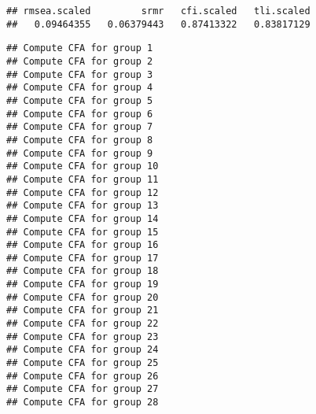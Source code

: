 \documentclass[
]{article}
\newenvironment{Shaded}{\begin{snugshade}}{\end{snugshade}}
\newcommand{\AttributeTok}[1]{\textcolor[rgb]{0.77,0.63,0.00}{#1}}
\newcommand{\CommentTok}[1]{\textcolor[rgb]{0.56,0.35,0.01}{\textit{#1}}}
\newcommand{\FloatTok}[1]{\textcolor[rgb]{0.00,0.00,0.81}{#1}}
\newcommand{\FunctionTok}[1]{\textcolor[rgb]{0.00,0.00,0.00}{#1}}
\newcommand{\NormalTok}[1]{#1}
\newcommand{\OtherTok}[1]{\textcolor[rgb]{0.56,0.35,0.01}{#1}}
\newcommand{\SpecialCharTok}[1]{\textcolor[rgb]{0.00,0.00,0.00}{#1}}
\newcommand{\StringTok}[1]{\textcolor[rgb]{0.31,0.60,0.02}{#1}}
\begin{document}
\begin{verbatim}
## rmsea.scaled         srmr   cfi.scaled   tli.scaled 
##   0.09464355   0.06379443   0.87413322   0.83817129
\end{verbatim}

\begin{Shaded}
\end{Shaded}

\begin{verbatim}
## Compute CFA for group 1
## Compute CFA for group 2
## Compute CFA for group 3
## Compute CFA for group 4
## Compute CFA for group 5
## Compute CFA for group 6
## Compute CFA for group 7
## Compute CFA for group 8
## Compute CFA for group 9
## Compute CFA for group 10
## Compute CFA for group 11
## Compute CFA for group 12
## Compute CFA for group 13
## Compute CFA for group 14
## Compute CFA for group 15
## Compute CFA for group 16
## Compute CFA for group 17
## Compute CFA for group 18
## Compute CFA for group 19
## Compute CFA for group 20
## Compute CFA for group 21
## Compute CFA for group 22
## Compute CFA for group 23
## Compute CFA for group 24
## Compute CFA for group 25
## Compute CFA for group 26
## Compute CFA for group 27
## Compute CFA for group 28
\end{verbatim}

\begin{Shaded}
\end{Shaded}
\end{document}
